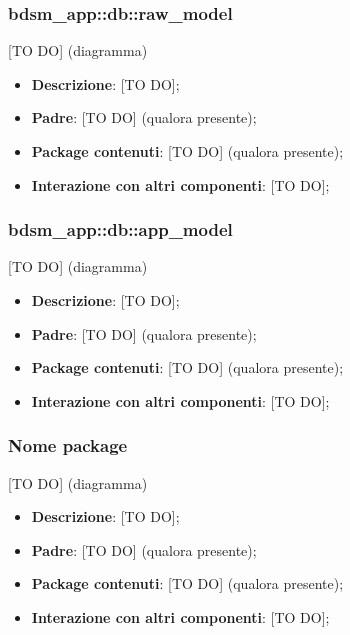 
  \subsubsection{bdsm\_app::db::raw\_model} %
  \label{ssub:bdsm_app_raw_model}
  [TO DO] (diagramma) \newline \newline

  \begin{itemize}
    \item \textbf{Descrizione}: [TO DO];
    \item \textbf{Padre}: [TO DO] (qualora presente);
    \item \textbf{Package contenuti}: [TO DO] (qualora presente);
    \item \textbf{Interazione con altri componenti}: [TO DO];
  \end{itemize}

  \subsubsection{bdsm\_app::db::app\_model} %
  \label{ssub:bdsm_app_app_model}
  [TO DO] (diagramma) \newline \newline

  \begin{itemize}
    \item \textbf{Descrizione}: [TO DO];
    \item \textbf{Padre}: [TO DO] (qualora presente);
    \item \textbf{Package contenuti}: [TO DO] (qualora presente);
    \item \textbf{Interazione con altri componenti}: [TO DO];
  \end{itemize}



  \subsubsection{Nome package} %
  \label{ssub:nome_del_package}
  [TO DO] (diagramma) \newline \newline

  \begin{itemize}
    \item \textbf{Descrizione}: [TO DO];
    \item \textbf{Padre}: [TO DO] (qualora presente);
    \item \textbf{Package contenuti}: [TO DO] (qualora presente);
    \item \textbf{Interazione con altri componenti}: [TO DO];
  \end{itemize}

